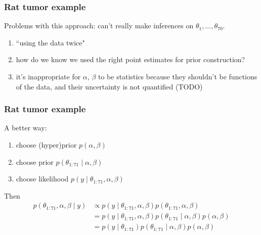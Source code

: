 \documentclass{beamer}
\begin{document}
\begin{frame}
\frametitle{Rat tumor example}

Problems with this approach: can't really make inferences on $\theta_1, \ldots, \theta_{70}$.

\begin{enumerate}
\item ``using the data twice"
\item how do we know we used the right point estimates for prior construction?
\item it's inappropriate for $\alpha$, $\beta$ to be statistics because they shouldn't be functions of the data, and their uncertainty is not quantified (TODO)
\end{enumerate}


\end{frame}

\begin{frame}
\frametitle{Rat tumor example}

A better way:
\begin{enumerate}
\item choose (hyper)prior $p(\alpha,\beta)$ 
\item choose prior $p(\theta_{1:71} \mid \alpha, \beta)$
\item choose likelihood $p(y \mid \theta_{1:71}, \alpha, \beta)$
\end{enumerate}

Then 
\begin{align*}
p(\theta_{1:71}, \alpha, \beta \mid y) &\propto p(y \mid \theta_{1:71}, \alpha, \beta)p(\theta_{1:71} , \alpha,\beta) \tag{Bayes'} \\
&= p(y \mid \theta_{1:71}, \alpha, \beta)p(\theta_{1:71} \mid \alpha, \beta)p(\alpha,\beta) \tag{defn.}\\
&= p(y \mid \theta_{1:71} )p(\theta_{1:71} \mid \alpha, \beta)p(\alpha,\beta) \tag{condtl. indep.} 
\end{align*}


\end{frame}
\end{document}
